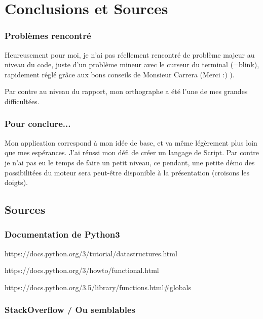 \documentclass{report}
\begin{document}
\part{Conclusions et Sources}
\section{Problèmes rencontré}
Heureusement pour moi, je n'ai pas réellement rencontré de problème majeur au niveau du code, juste d'un problème mineur avec le curseur du terminal (=blink), rapidement réglé grâce aux bons conseils de Monsieur Carrera (Merci :) ).

Par contre au niveau du rapport, mon orthographe a été l'une de mes grandes difficultées.

\section{Pour conclure...}
Mon application correspond à mon idée de base, et va même légèrement plus loin que mes espérances. J'ai réussi mon défi de créer un langage de Script. Par contre je n'ai pas eu le temps de faire un petit niveau, ce pendant, une petite démo des possibilitées du moteur sera peut-être disponible à la présentation (croisons les doigts).

\chapter{Sources}
\section*{Documentation de Python3}
\par https://docs.python.org/3/tutorial/datastructures.html
\newline\par https://docs.python.org/3/howto/functional.html
\newline\par https://docs.python.org/3.5/library/functions.html\#globals

\section*{StackOverflow / Ou semblables}
\end{document}
